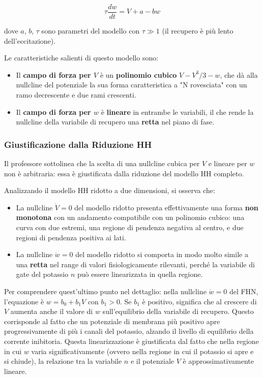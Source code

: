 \begin{equation}
\tau \frac{dw}{dt} = V + a - bw
\end{equation}

dove $a$, $b$, $\tau$ sono parametri del modello con $\tau \gg 1$ (il recupero è più lento dell'eccitazione).

Le caratteristiche salienti di questo modello sono:
\begin{itemize}
    \item Il \textbf{campo di forza per $V$} è un \textbf{polinomio cubico} $V - V^3/3 - w$, che dà alla nullcline del potenziale la sua forma caratteristica a "N rovesciata" con un ramo decrescente e due rami crescenti.
    \item Il \textbf{campo di forza per $w$} è \textbf{lineare} in entrambe le variabili, il che rende la nullcline della variabile di recupero una \textbf{retta} nel piano di fase.
\end{itemize}

\subsubsection{Giustificazione dalla Riduzione HH}

Il professore sottolinea che la scelta di una nullcline cubica per $V$ e lineare per $w$ non è arbitraria: essa è giustificata dalla riduzione del modello HH completo.

Analizzando il modello HH ridotto a due dimensioni, si osserva che:
\begin{itemize}
    \item La nullcline $\dot{V} = 0$ del modello ridotto presenta effettivamente una forma \textbf{non monotona} con un andamento compatibile con un polinomio cubico: una curva con due estremi, una regione di pendenza negativa al centro, e due regioni di pendenza positiva ai lati.
    \item La nullcline $\dot{w} = 0$ del modello ridotto si comporta in modo molto simile a una \textbf{retta} nel range di valori fisiologicamente rilevanti, perché la variabile di gate del potassio $n$ può essere linearizzata in quella regione.
\end{itemize}

Per comprendere quest'ultimo punto nel dettaglio: nella nullcline $\dot{w} = 0$ del FHN, l'equazione è $w = b_0 + b_1 V$ con $b_1 > 0$. Se $b_1$ è positivo, significa che al crescere di $V$ aumenta anche il valore di $w$ sull'equilibrio della variabile di recupero. Questo corrisponde al fatto che un potenziale di membrana più positivo apre progressivamente di più i canali del potassio, alzando il livello di equilibrio della corrente inibitoria. Questa linearizzazione è giustificata dal fatto che nella regione in cui $w$ varia significativamente (ovvero nella regione in cui il potassio si apre e si chiude), la relazione tra la variabile $n$ e il potenziale $V$ è approssimativamente lineare.

